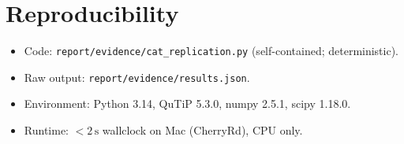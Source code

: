 \documentclass[11pt,letterpaper]{article}
\begin{document}
\section*{Reproducibility}
\begin{itemize}
  \item Code: \verb|report/evidence/cat_replication.py| (self-contained; deterministic).
  \item Raw output: \verb|report/evidence/results.json|.
  \item Environment: Python 3.14, QuTiP 5.3.0, numpy 2.5.1, scipy 1.18.0.
  \item Runtime: $<2\,\text{s}$ wallclock on Mac (CherryRd), CPU only.
\end{itemize}
\end{document}
